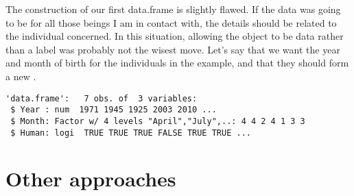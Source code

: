 The construction of our first data.frame is slightly flawed. If the  data was going to be for all those beings I am in contact with, the details should be related to the individual concerned. In this situation, allowing the  object to be data rather than a label was probably not the wisest move. Let's say that we want the year and month of birth for the individuals in the example, and that they should form a new . 
\begin{knitrout}
\color{fgcolor}\begin{kframe}
\begin{alltt}
\hlstd{> } \hlkwb{=} \hlstd{(}\hlstd{,} \hlstd{,} \hlstd{,} \hlstd{,} \hlstd{,} \hlstd{,} \hlstd{)}
\hlstd{> } \hlkwb{=} \hlstd{(}\hlstd{,} \hlstd{,} \hlstd{,} \hlstd{,} \hlstd{,} \hlstd{,} \hlstd{)}
\hlstd{> } \hlkwb{=}   
\hlstd{> }
\end{alltt}
\begin{verbatim}
'data.frame':	7 obs. of  3 variables:
 $ Year : num  1971 1945 1925 2003 2010 ...
 $ Month: Factor w/ 4 levels "April","July",..: 4 4 2 4 1 3 3
 $ Human: logi  TRUE TRUE TRUE FALSE TRUE TRUE ...
\end{verbatim}
\end{kframe}
\end{knitrout}
 
\section{Other approaches} 
 
